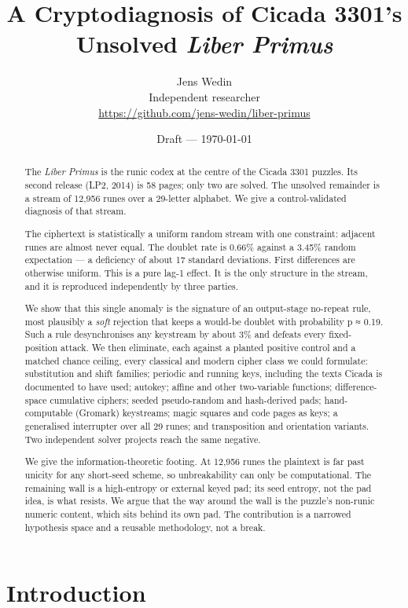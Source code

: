 \documentclass[11pt]{article}
\title{A Cryptodiagnosis of Cicada 3301's Unsolved \emph{Liber Primus}}
\author{Jens Wedin\\[2pt]\small Independent researcher\\
  \small\url{https://github.com/jens-wedin/liber-primus}}
\date{Draft --- \today}
\begin{document}
\maketitle

\begin{abstract}
The \emph{Liber Primus} is the runic codex at the centre of the Cicada 3301 puzzles. Its second release (LP2, 2014) is 58 pages; only two are solved. The unsolved remainder is a stream of 12,956 runes over a 29-letter alphabet. We give a control-validated diagnosis of that stream.

The ciphertext is statistically a uniform random stream with one constraint: adjacent runes are almost never equal. The doublet rate is 0.66\% against a 3.45\% random expectation — a deficiency of about 17 standard deviations. First differences are otherwise uniform. This is a pure lag-1 effect. It is the only structure in the stream, and it is reproduced independently by three parties.

We show that this single anomaly is the signature of an output-stage no-repeat rule, most plausibly a \emph{soft} rejection that keeps a would-be doublet with probability p ≈ 0.19. Such a rule desynchronises any keystream by about 3\% and defeats every fixed-position attack. We then eliminate, each against a planted positive control and a matched chance ceiling, every classical and modern cipher class we could formulate: substitution and shift families; periodic and running keys, including the texts Cicada is documented to have used; autokey; affine and other two-variable functions; difference-space cumulative ciphers; seeded pseudo-random and hash-derived pads; hand-computable (Gromark) keystreams; magic squares and code pages as keys; a generalised interrupter over all 29 runes; and transposition and orientation variants. Two independent solver projects reach the same negative.

We give the information-theoretic footing. At 12,956 runes the plaintext is far past unicity for any short-seed scheme, so unbreakability can only be computational. The remaining wall is a high-entropy or external keyed pad; its seed entropy, not the pad idea, is what resists. We argue that the way around the wall is the puzzle's non-runic numeric content, which sits behind its own pad. The contribution is a narrowed hypothesis space and a reusable methodology, not a break.

\end{abstract}

\section{Introduction}
\end{document}
